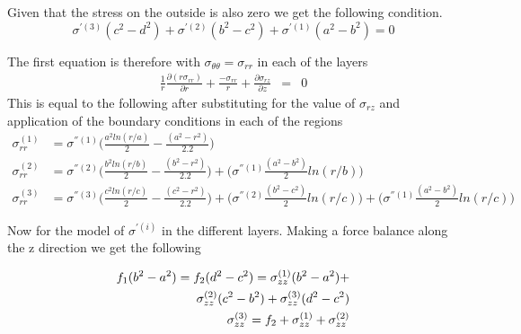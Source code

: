 \documentclass[11pt]{article} %
\makeatletter
\def \beg {\begin{equation}}
\def \en {\end{equation}}
\newcommand{\ece}[2]{
	\expandafter#1\csname#2\endcsname
}%
\newcommand{\setproperty}[3]{%
	\ece \edef{#1@p#2}{#3}
}%
\newcommand{\getproperty}[2]{%
  \expandafter\ifx\csname#1@p#2\endcsname\relax
  \else \csname#1@p#2\endcsname
  \fi
}%
\makeatother
\begin{document}
	Given that the stress on the outside is also zero we get the following condition.
	\beg
		\boxed {
			\sigma^{'(3)}({c}^{2} - {d}^{2})  + \sigma^{'(2)}({b}^{2} - {c}^{2})  +  \sigma^{'(1)}({a}^{2} - {b}^{2})  = 0
		}
	\en

%
%

	The first equation is therefore with $\sigma_{\theta\theta} = \sigma_{rr}$ in each of the layers
	\beg
		\begin{aligned}
			\frac{1}{r}\frac{\partial(r\sigma_{rr})}{\partial r} + \frac {- \sigma_{rr}}{r} +   
					\frac{\partial \sigma_{rz}}{\partial z}  & =  &  0 
		\end{aligned}
	\en
	This is equal to the following after substituting for the value of  $\sigma_{rz} $ and application of the boundary conditions in each of the regions 
	\beg		
		\boxed{
			\begin{aligned}
				\sigma_{rr}^{(1)} & = \sigma^{''(1)}\Bigg({\frac {a^{2} ln{(r/a)}}{2} - \frac{(a^2 - r^2)}{2.2} } \Bigg)\\
%					
				\sigma_{rr}^{(2)} & = \sigma^{''(2)}\Bigg({\frac {b^{2} ln{(r/b)}}{2} - \frac{(b^2 - r^2)}{2.2} } \Bigg) + 		\Bigg(\sigma^{''(1)}\frac{(a^{2} -b^{2})}{2} ln(r/b) \Bigg)\\ 
%					
				\sigma_{rr}^{(3)} & = \sigma^{''(3)}\Bigg({\frac {c^{2} ln{(r/c)}}{2} - \frac{(c^2 - r^2)}{2.2} } \Bigg)  + 		\Bigg(\sigma^{''(2)}\frac{(b^{2} -c^{2})}{2} ln(r/c) \Bigg) +\Bigg(\sigma^{''(1)}\frac{(a^{2} -b^{2})}{2} ln(r/c) \Bigg)   
			\end{aligned}	
		}
	\en

	Now for the model of $\sigma^{'(i)} $ in the different layers.
	Making a force balance along the z direction we get the following

	

	\beg
		\begin{aligned}
			f_1(b^{2} - a^{2}) = f_2(d^{2} - c^{2}) = \sigma_{zz}^{(1)}(b^{2} - a^{2}) +  \\
				\sigma_{zz}^{(2)}(c^{2} - b^{2}) + \sigma_{zz}^{(3)}(d^2 - c^2) \\
			\sigma_{zz}^{(3)} = f_2 + \sigma_{zz}^{(1)}\getproperty{sigma_coeff}{v1} + \sigma_{zz}^{(2)} \getproperty{sigma_coeff}{v2}					 
		\end{aligned}		
	\en
\end{document}
